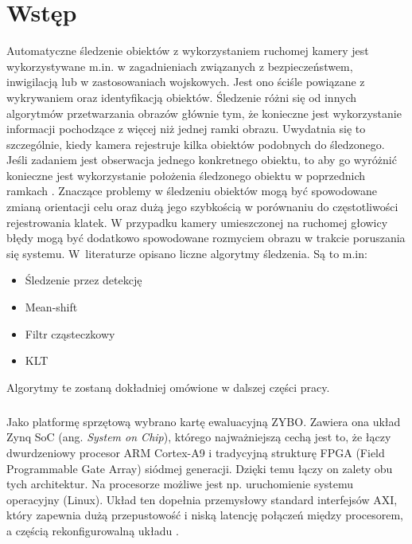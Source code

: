 \chapter{Wstęp}
\label{cha:wstep}




Automatyczne śledzenie obiektów z wykorzystaniem ruchomej kamery jest wykorzystywane m.in. w zagadnieniach związanych z bezpieczeństwem, inwigilacją lub w zastosowaniach wojskowych.
Jest ono ściśle powiązane z wykrywaniem oraz identyfikacją obiektów.
Śledzenie różni się od innych algorytmów przetwarzania obrazów głównie tym, że konieczne jest wykorzystanie informacji pochodzące z więcej niż jednej ramki obrazu.
Uwydatnia się to szczególnie, kiedy kamera rejestruje kilka obiektów podobnych do śledzonego. 
Jeśli zadaniem jest obserwacja jednego konkretnego obiektu, to aby go wyróżnić konieczne jest wykorzystanie położenia śledzonego obiektu w poprzednich ramkach \cite{VT}.
Znaczące problemy w śledzeniu obiektów mogą być spowodowane zmianą orientacji celu oraz dużą jego szybkością w porównaniu do częstotliwości rejestrowania klatek.
W przypadku kamery umieszczonej na ruchomej głowicy błędy mogą być dodatkowo spowodowane rozmyciem obrazu w trakcie poruszania się systemu.
W~literaturze opisano liczne algorytmy śledzenia. Są to m.in:
\begin{itemize}
\item{Śledzenie przez detekcję}
\item{Mean-shift}
\item{Filtr cząsteczkowy}
\item{KLT}
\end{itemize}
Algorytmy te zostaną dokładniej omówione w dalszej części pracy.

\paragraph*{}
Jako platformę sprzętową wybrano kartę ewaluacyjną ZYBO. 
Zawiera ona układ Zynq SoC (ang. \textit{System on Chip}), którego najważniejszą cechą jest to, że łączy dwurdzeniowy procesor ARM Cortex-A9 i tradycyjną strukturę FPGA (Field Programmable Gate Array) siódmej generacji. 
Dzięki temu łączy on zalety obu tych architektur. 
Na procesorze możliwe jest np. uruchomienie systemu operacyjny (Linux). 
Układ ten dopełnia przemysłowy standard interfejsów AXI, który zapewnia dużą przepustowość i niską latencję połączeń między procesorem, a częścią rekonfigurowalną układu \cite{Zynq}.

